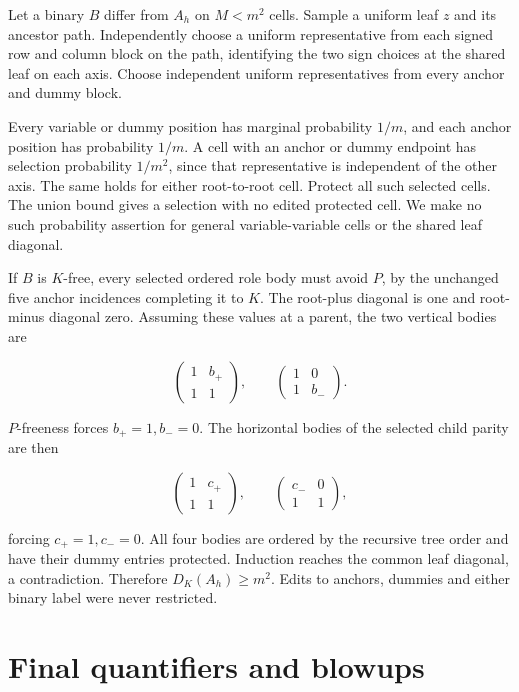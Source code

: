 \documentclass[11pt,letterpaper]{article}
\begin{document}
Let a binary \(B\) differ from \(A_h\) on \(M<m^{2}\) cells. Sample a
uniform leaf \(z\) and its ancestor path. Independently choose a uniform
representative from each signed row and column block on the path,
identifying the two sign choices at the shared leaf on each axis. Choose
independent uniform representatives from every anchor and dummy block.

Every variable or dummy position has marginal probability \(1/m\), and
each anchor position has probability \(1/m\). A cell with an anchor or
dummy endpoint has selection probability \(1/m^{2}\), since that
representative is independent of the other axis. The same holds for
either root-to-root cell. Protect all such selected cells. The union
bound gives a selection with no edited protected cell. We make no such
probability assertion for general variable-variable cells or the shared
leaf diagonal.

If \(B\) is \(K\)-free, every selected ordered role body must avoid
\(P\), by the unchanged five anchor incidences completing it to \(K\).
The root-plus diagonal is one and root-minus diagonal zero. Assuming
these values at a parent, the two vertical bodies are

\[
 \begin{pmatrix}1&b_+\\1&1\end{pmatrix},\qquad
 \begin{pmatrix}1&0\\1&b_-\end{pmatrix}.
\]

\(P\)-freeness forces \(b_+=1,b_-=0\). The horizontal bodies of the
selected child parity are then

\[
 \begin{pmatrix}1&c_+\\1&1\end{pmatrix},\qquad
 \begin{pmatrix}c_-&0\\1&1\end{pmatrix},
\]

forcing \(c_+=1,c_-=0\). All four bodies are ordered by the recursive
tree order and have their dummy entries protected. Induction reaches the
common leaf diagonal, a contradiction. Therefore \(D_K(A_h)\ge m^{2}\).
Edits to anchors, dummies and either binary label were never restricted.

\section{Final quantifiers and
blowups}\label{final-quantifiers-and-blowups}
\end{document}
